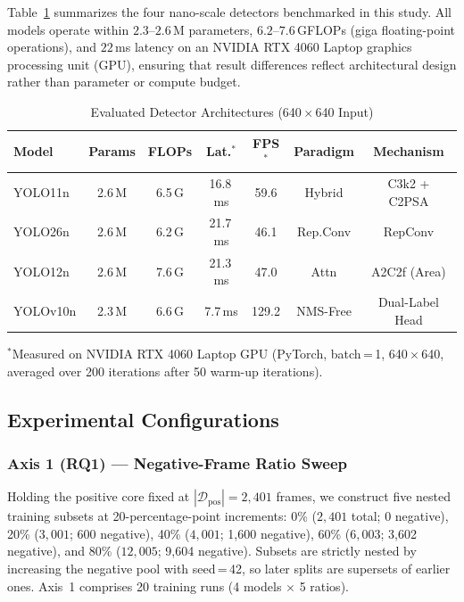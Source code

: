 \documentclass[conference]{IEEEtran}
\begin{document}
Table~\ref{tab:architectures} summarizes the four nano-scale
detectors benchmarked in this study. All models operate within
$2.3$--$2.6$\,M parameters, $6.2$--$7.6$\,GFLOPs (giga
floating-point operations), and $22$\,ms latency on an NVIDIA
RTX 4060 Laptop graphics processing unit (GPU), ensuring that
result differences reflect architectural design rather than
parameter or compute budget.

\begin{table}[t]
\caption{Evaluated Detector Architectures (640\,$\times$\,640 Input)}
\label{tab:architectures}
\centering
\setlength{\tabcolsep}{1.6pt}
\begin{tabular}{lcccccc}
\toprule
\textbf{Model} & \textbf{Params} & \textbf{FLOPs} &
\textbf{Lat.$^*$} & \textbf{FPS$^*$} &
\textbf{Paradigm} & \textbf{Mechanism} \\
\midrule
YOLO11n  & 2.6\,M & 6.5\,G & 16.8\,ms & 59.6  & Hybrid    & C3k2 + C2PSA \\
YOLO26n  & 2.6\,M & 6.2\,G & 21.7\,ms & 46.1  & Rep.Conv  & RepConv \\
YOLO12n  & 2.6\,M & 7.6\,G & 21.3\,ms & 47.0  & Attn      & A2C2f (Area) \\
YOLOv10n & 2.3\,M & 6.6\,G & 7.7\,ms  & 129.2 & NMS-Free  & Dual-Label Head \\
\bottomrule
\end{tabular}
\vspace{1pt}
{\footnotesize $^*$Measured on NVIDIA RTX 4060 Laptop GPU (PyTorch,
batch\,=\,1, 640\,$\times$\,640, averaged over 200 iterations after
50 warm-up iterations).}
\end{table}

\subsection{Experimental Configurations}
\label{subsec:configurations}

\subsubsection{Axis 1 (RQ1) --- Negative-Frame Ratio Sweep}
Holding the positive core fixed at $|\mathcal{D}_{\mathrm{pos}}|
= 2{,}401$ frames, we construct five nested training subsets at
20-percentage-point increments: 0\% ($2{,}401$ total; 0 negative),
20\% ($3{,}001$; 600 negative), 40\% ($4{,}001$; 1,600 negative),
60\% ($6{,}003$; 3,602 negative), and 80\% ($12{,}005$; 9,604
negative). Subsets are strictly nested by increasing the negative
pool with seed\,=\,42, so later splits are supersets of earlier
ones. Axis~1 comprises 20 training runs (4 models $\times$ 5 ratios).
\end{document}
